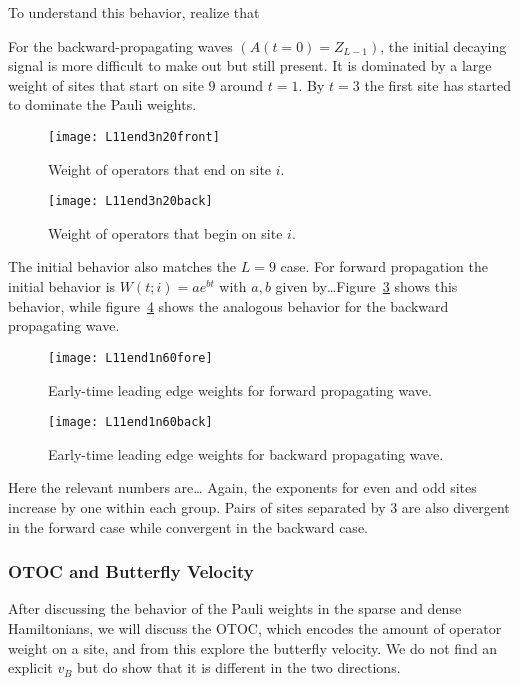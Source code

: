 To understand this behavior, realize that 

For the backward-propagating waves $(A(t=0)=Z_{L-1})$, the initial decaying signal is more difficult to make out but still present. It is dominated by a large weight of sites that start on site 9 around $t=1$. By $t = 3$ the first site has started to dominate the Pauli weights.

\begin{figure}
	\centering
	\texttt{[image: L11end3n20front]}
	\caption{Weight of operators that end on site $i$.}
	\label{fig:L11end3n20front}
\end{figure}
\begin{figure}
	\centering
	\texttt{[image: L11end3n20back]}
	\caption{Weight of operators that begin on site $i$.}
	\label{fig:L11end3n20back}
\end{figure}

The initial behavior also matches the $L=9$ case. For forward propagation the initial behavior is $W(t;i) = ae^{bt}$ with $a,b$ given by\dots Figure~\ref{fig:L11end1n60fore} shows this behavior, while figure~\ref{fig:L11end1n60back} shows the analogous behavior for the backward propagating wave. 

\begin{figure}
	\centering
	\texttt{[image: L11end1n60fore]}
	\caption{Early-time leading edge weights for forward propagating wave.}
	\label{fig:L11end1n60fore}
\end{figure}
\begin{figure}
	\centering
	\texttt{[image: L11end1n60back]}
	\caption{Early-time leading edge weights for backward propagating wave.}
	\label{fig:L11end1n60back}
\end{figure}

Here the relevant numbers are\dots
Again, the exponents for even and odd sites increase by one within each group. Pairs of sites separated by 3 are also divergent in the forward case while convergent in the backward case.

\subsubsection{OTOC and Butterfly Velocity} \label{subsub:otoc}

After discussing the behavior of the Pauli weights in the sparse and dense Hamiltonians, we will discuss the OTOC, which encodes the amount of operator weight on a site, and from this explore the butterfly velocity. We do not find an explicit $v_B$ but do show that it is different in the two directions.